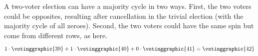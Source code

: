 \begin{ans}{5}
      \begin{exparts}
        \partsitem A two-voter election can have a majority cycle in two ways.
          First, the two voters could be opposites,
          resulting after cancellation in the trivial election (with the
          majority cycle of all zeroes).
          Second, the two voters could have the same spin but come from
          different rows, as here.
          \begin{equation*}
            1\cdot \votinggraphic{39}
            +1\cdot\votinggraphic{40}
            +0\cdot\votinggraphic{41}
            =\votinggraphic{42}

\end{equation*}
\end{exparts}
\end{ans}
